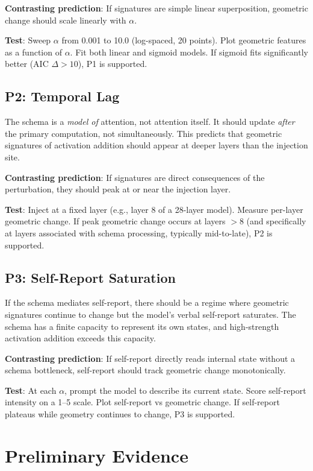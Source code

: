 \documentclass[11pt,letterpaper]{article}
\begin{document}
\textbf{Contrasting prediction}: If signatures are simple linear
superposition, geometric change should scale linearly with $\alpha$.

\textbf{Test}: Sweep $\alpha$ from 0.001 to 10.0 (log-spaced, 20
points). Plot geometric features as a function of $\alpha$. Fit
both linear and sigmoid models. If sigmoid fits significantly
better (AIC $\Delta > 10$), P1 is supported.

\subsection{P2: Temporal Lag}

The schema is a \emph{model of} attention, not attention itself. It
should update \emph{after} the primary computation, not
simultaneously. This predicts that geometric signatures of
activation addition should appear at deeper layers than the
injection site.

\textbf{Contrasting prediction}: If signatures are direct
consequences of the perturbation, they should peak at or near the
injection layer.

\textbf{Test}: Inject at a fixed layer (e.g., layer 8 of a 28-layer
model). Measure per-layer geometric change. If peak geometric change
occurs at layers $> 8$ (and specifically at layers associated with
schema processing, typically mid-to-late), P2 is supported.

\subsection{P3: Self-Report Saturation}

If the schema mediates self-report, there should be a regime where
geometric signatures continue to change but the model's verbal
self-report saturates. The schema has a finite capacity to represent
its own states, and high-strength activation addition exceeds this
capacity.

\textbf{Contrasting prediction}: If self-report directly reads
internal state without a schema bottleneck, self-report should
track geometric change monotonically.

\textbf{Test}: At each $\alpha$, prompt the model to describe its
current state. Score self-report intensity on a 1--5 scale. Plot
self-report vs geometric change. If self-report plateaus while
geometry continues to change, P3 is supported.

\section{Preliminary Evidence}
\end{document}
